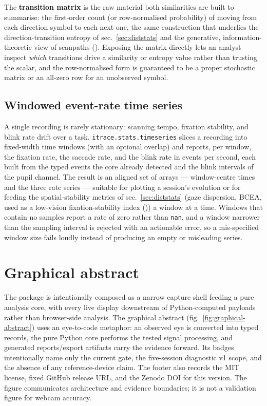 \documentclass[
]{article}
\newcounter{none} %
\begin{document}
The \textbf{transition matrix} is the raw material both similarities are
built to summarise: the first-order count (or row-normalised
probability) of moving from each direction symbol to each next one, the
same construction that underlies the direction-transition entropy of
sec.~\ref{sec:diststats} and the generative, information-theoretic view
of scanpaths (). Exposing the matrix directly lets an analyst inspect
\emph{which} transitions drive a similarity or entropy value rather than
trusting the scalar, and the row-normalised form is guaranteed to be a
proper stochastic matrix or an all-zero row for an unobserved symbol.

\subsection{Windowed event-rate time
series}\label{windowed-event-rate-time-series}

A single recording is rarely stationary: scanning tempo, fixation
stability, and blink rate drift over a task.
\texttt{itrace.stats.timeseries} slices a recording into fixed-width
time windows (with an optional overlap) and reports, per window, the
fixation rate, the saccade rate, and the blink rate in events per
second, each built from the typed events the core already detected and
the blink intervals of the pupil channel. The result is an aligned set
of arrays --- window-centre times and the three rate series --- suitable
for plotting a session's evolution or for feeding the spatial-stability
metrics of sec.~\ref{sec:diststats} (gaze dispersion, BCEA, used as a
low-vision fixation-stability index
()) a
window at a time. Windows that contain no samples report a rate of zero
rather than \texttt{nan}, and a window narrower than the sampling
interval is rejected with an actionable error, so a mis-specified window
size fails loudly instead of producing an empty or misleading series.

\section{Graphical abstract}\label{sec:graphical-abstract}

The package is intentionally composed as a narrow capture shell feeding
a pure analysis core, with every live display downstream of
Python-computed payloads rather than browser-side analysis. The
graphical abstract (fig.~\ref{fig:graphical-abstract}) uses an
eye-to-code metaphor: an observed eye is converted into typed records,
the pure Python core performs the tested signal processing, and
generated reports/export artifacts carry the evidence forward. Its
badges intentionally name only the current gate, the five-session
diagnostic v1 scope, and the absence of any reference-device claim. The
footer also records the MIT license, fixed GitHub release URL, and the
Zenodo DOI for this version. The figure communicates architecture and
evidence boundaries; it is not a validation figure for webcam accuracy.
\end{document}
